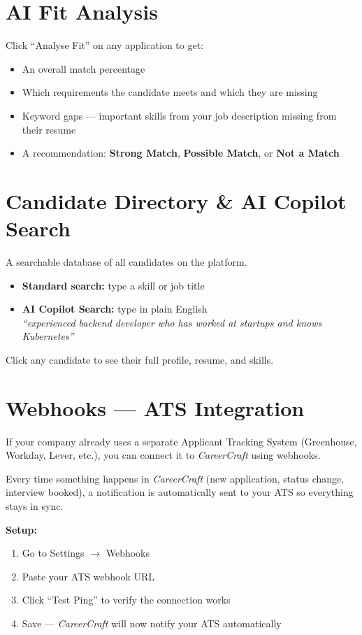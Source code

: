 \documentclass[12pt, a4paper]{report}
\newcommand{\cc}{\textit{CareerCraft}}
\begin{document}
\section{AI Fit Analysis}

Click ``Analyse Fit'' on any application to get:
\begin{itemize}
  \item An overall match percentage
  \item Which requirements the candidate meets and which they are missing
  \item Keyword gaps --- important skills from your job description missing from their resume
  \item A recommendation: \textbf{Strong Match}, \textbf{Possible Match}, or \textbf{Not a Match}
\end{itemize}

\section{Candidate Directory \& AI Copilot Search}

A searchable database of all candidates on the platform.

\begin{itemize}
  \item \textbf{Standard search:} type a skill or job title
  \item \textbf{AI Copilot Search:} type in plain English\\
        \textit{``experienced backend developer who has worked at startups and knows Kubernetes''}
\end{itemize}

Click any candidate to see their full profile, resume, and skills.

\section{Webhooks --- ATS Integration}

If your company already uses a separate Applicant Tracking System (Greenhouse,
Workday, Lever, etc.), you can connect it to \cc{} using webhooks.

Every time something happens in \cc{} (new application, status change, interview
booked), a notification is automatically sent to your ATS so everything stays in sync.

\textbf{Setup:}
\begin{enumerate}
  \item Go to Settings $\to$ Webhooks
  \item Paste your ATS webhook URL
  \item Click ``Test Ping'' to verify the connection works
  \item Save --- \cc{} will now notify your ATS automatically
\end{enumerate}
\end{document}
